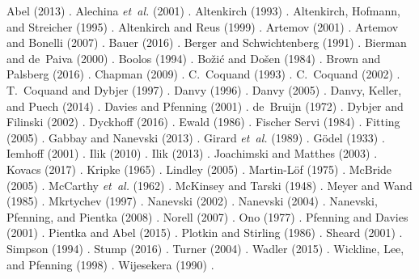 \documentclass{entcs}
\numberwithin{equation}{thm}
\renewcommand{\:}{\mathrel{:}}
\newcommand{\0}{\varnothing}
\begin{document}
Abel (2013) \cite{Abel2013}.
Alechina \emph{et~al.} (2001) \cite{AlechinaMPR2001}.
Altenkirch (1993) \cite{Altenkirch1993}.
Altenkirch, Hofmann, and Streicher (1995) \cite{AltenkirchHS1995}.
Altenkirch and Reus (1999) \cite{AltenkirchR1999}.
Artemov (2001) \cite{Artemov2001}.
Artemov and Bonelli (2007) \cite{ArtemovB2007}.
Bauer (2016) \cite{Bauer2016}.
Berger and Schwichtenberg (1991) \cite{BergerS1991}.
Bierman and de~Paiva (2000) \cite{BiermanP2000}.
Boolos (1994) \cite{Boolos1994}.
Bo\v{z}i\'{c} and Do\v{s}en (1984) \cite{BozicD1984}.
Brown and Palsberg (2016) \cite{BrownP2016}.
Chapman (2009) \cite{Chapman2009}.
C.~Coquand (1993) \cite{Coquand1993}.
C.~Coquand (2002) \cite{Coquand2002}.
T.~Coquand and Dybjer (1997) \cite{CoquandD1997}.
Danvy (1996) \cite{Danvy1996}.
Danvy (2005) \cite{Danvy2005}.
Danvy, Keller, and Puech (2014) \cite{DanvyKP2014}.
Davies and Pfenning (2001) \cite{DaviesP2001}.
de~Bruijn (1972) \cite{DeBruijn1972}.
Dybjer and Filinski (2002) \cite{DybjerF2002}.
Dyckhoff (2016) \cite{Dyckhoff2016}.
Ewald (1986) \cite{Ewald1986}.
Fischer Servi (1984) \cite{FischerServi1984}.
Fitting (2005) \cite{Fitting2005}.
Gabbay and Nanevski (2013) \cite{GabbayN2013}.
Girard \emph{et~al.} (1989) \cite{GirardTL1989}.
G\"{o}del (1933) \cite{Goedel1933}.
Iemhoff (2001) \cite{Iemhoff2001}.
Ilik (2010) \cite{Ilik2010}.
Ilik (2013) \cite{Ilik2013}.
Joachimski and Matthes (2003) \cite{JoachimskiM2003}.
Kovacs (2017) \cite{Kovacs2017}.
Kripke (1965) \cite{Kripke1965}.
Lindley (2005) \cite{Lindley2005}.
Martin-L\"{o}f (1975) \cite{MartinLoef1975}.
McBride (2005) \cite{McBride2005}.
McCarthy \emph{et~al.} (1962) \cite{McCarthyAEHL1962}.
McKinsey and Tarski (1948) \cite{McKinseyT1948}.
Meyer and Wand (1985) \cite{MeyerW1985}.
Mkrtychev (1997) \cite{Mkrtychev1997}.
Nanevski (2002) \cite{Nanevski2002}.
Nanevski (2004) \cite{Nanevski2004}.
Nanevski, Pfenning, and Pientka (2008) \cite{NanevskiPP2008}.
Norell (2007) \cite{Norell2007}.
Ono (1977) \cite{Ono1977}.
Pfenning and Davies (2001) \cite{PfenningD2001}.
Pientka and Abel (2015) \cite{PientkaA2015}.
Plotkin and Stirling (1986) \cite{PlotkinS1986}.
Sheard (2001) \cite{Sheard2001}.
Simpson (1994) \cite{Simpson1994}.
Stump (2016) \cite{Stump2016}.
Turner (2004) \cite{Turner2004}.
Wadler (2015) \cite{Wadler2015}.
Wickline, Lee, and Pfenning (1998) \cite{WicklineLP1998}.
Wijesekera (1990) \cite{Wijesekera1990}.




\end{document}
